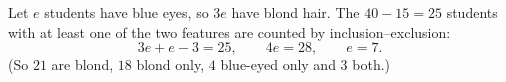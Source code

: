 Let $e$ students have blue eyes, so $3e$ have blond hair. The $40-15=25$ students with at least one of the two features are counted by inclusion--exclusion:
\[
3e+e-3=25,\qquad 4e=28,\qquad e=\boxed{7}.
\]
(So $21$ are blond, $18$ blond only, $4$ blue-eyed only and $3$ both.)
